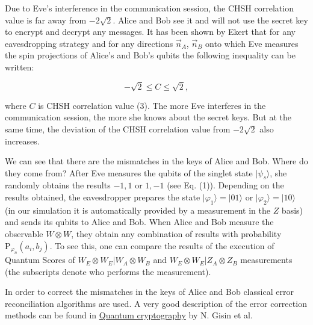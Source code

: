 \documentclass[11pt]{article}
\begin{document}
    Due to Eve's interference in the communication session, the CHSH
correlation value is far away from \(-2 \sqrt{2}\). Alice and Bob see it
and will not use the secret key to encrypt and decrypt any messages. It
has been shown by Ekert that for any eavesdropping strategy and for any
directions \(\vec{n}_A\), \(\vec{n}_B\) onto which Eve measures the spin
projections of Alice's and Bob's qubits the following inequality can be
written:

\[ -\sqrt{2} \leqslant C \leqslant \sqrt{2},\]

where \(C\) is CHSH correlation value (3). The more Eve interferes in
the communication session, the more she knows about the secret keys. But
at the same time, the deviation of the CHSH correlation value from
\(-2\sqrt{2}\) also increases.

We can see that there are the mismatches in the keys of Alice and Bob.
Where do they come from? After Eve measures the qubits of the singlet
state \(\lvert \psi_s \rangle\), she randomly obtains the results
\(-1,1\) or \(1,-1\) (see Eq. (1)). Depending on the results obtained,
the eavesdropper prepares the state
\(\lvert \varphi_1 \rangle = \lvert 01 \rangle\) or
\(\lvert \varphi_2 \rangle = \lvert 10 \rangle\) (in our simulation it
is automatically provided by a measurement in the \(Z\) basis) and sends
its qubits to Alice and Bob. When Alice and Bob measure the observable
\(W \otimes W\), they obtain any combination of results with probability
\(\mathrm{P}_{\varphi_{n}}(a_i, b_j)\). To see this, one can compare the
results of the execution of Quantum Scores of
\href{https://quantumexperience.ng.bluemix.net/share/code/1c4d96685cb20c2b99e43f9999b28313/execution/917dca7c81dfda7886af97eef85d5946}{\(W_E \otimes W_E \vert W_A \otimes W_B\)}
and
\href{https://quantumexperience.ng.bluemix.net/share/code/0d378f5f16990ab3e47546ae4b0c39d2/execution/e836b67e10e9d11d7828a67a834cf4fd}{\(W_E \otimes W_E \vert Z_A \otimes Z_B\)}
measurements (the subscripts denote who performs the measurement).

In order to correct the mismatches in the keys of Alice and Bob
classical error reconciliation algorithms are used. A very good
description of the error correction methods can be found in
\href{https://arxiv.org/abs/quant-ph/0101098}{Quantum cryptography} by
N. Gisin et al.


    
    
    
    
\end{document}
